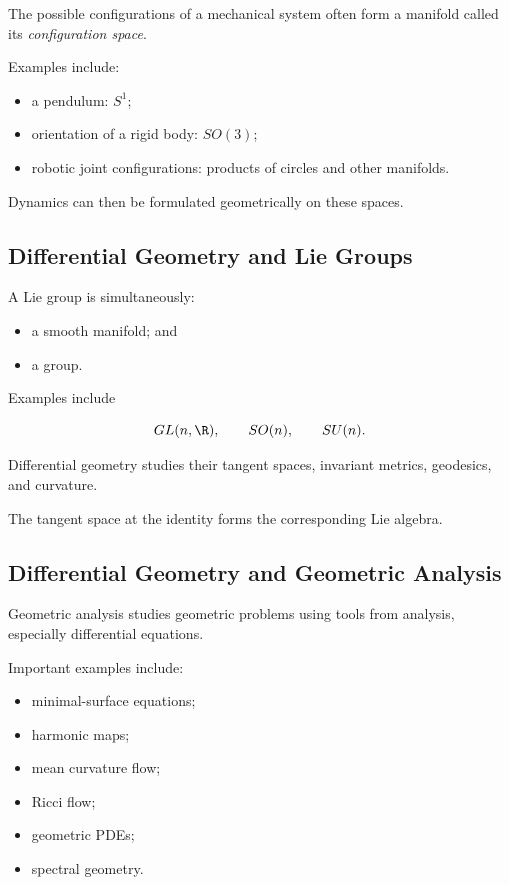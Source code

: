 The possible configurations of a mechanical system often form a manifold
called its \emph{configuration space}.

Examples include:

\begin{itemize}
    \item a pendulum: \(S^1\);
    \item orientation of a rigid body: \(SO(3)\);
    \item robotic joint configurations: products of circles and other
    manifolds.
\end{itemize}

Dynamics can then be formulated geometrically on these spaces.

\subsection{Differential Geometry and Lie Groups}
\label{subsec:differential-geometry-lie-groups}

A Lie group is simultaneously:

\begin{itemize}
    \item a smooth manifold; and
    \item a group.
\end{itemize}

Examples include

\[
GL(n,\R),
\qquad
SO(n),
\qquad
SU(n).
\]

Differential geometry studies their tangent spaces, invariant metrics,
geodesics, and curvature.

The tangent space at the identity forms the corresponding Lie algebra.

\subsection{Differential Geometry and Geometric Analysis}
\label{subsec:differential-geometry-geometric-analysis}

Geometric analysis studies geometric problems using tools from analysis,
especially differential equations.

Important examples include:

\begin{itemize}
    \item minimal-surface equations;
    \item harmonic maps;
    \item mean curvature flow;
    \item Ricci flow;
    \item geometric PDEs;
    \item spectral geometry.
\end{itemize}

